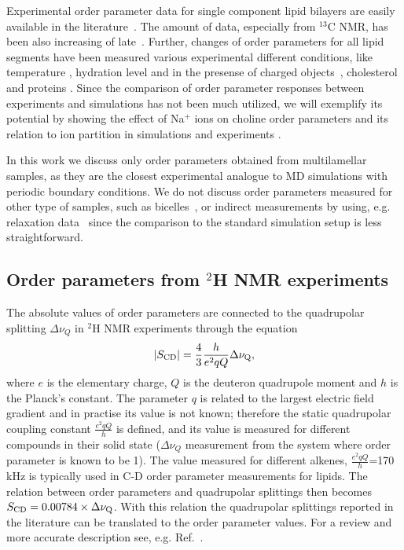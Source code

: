 \documentclass[aps,prl,superscriptaddress,twocolumn]{revtex4}
\begin{document}
Experimental order parameter data for single component lipid bilayers are easily available in the literature~\cite{castro07,castro08,leftin11,marsh13,ferreira13,leftin13,leftin14,botan15}. 
The amount of data, especially from $^{13}$C NMR, has been also increasing of late~\cite{castro07,castro08,ferreira13,leftin13,leftin14}.
Further, changes of order parameters for all lipid segments have been measured various experimental
different conditions, like temperature \cite{seelig74,gally75,seelig77,douliez95}, 
hydration level \cite{bechinger91,ulrich94,mallikarjunaiah11,dvinskikh05a} and in the presense 
of charged objects~\cite{akutsu81,altenbach84,seelig87,scherer89}, 
cholesterol \cite{brown78,douliez95,ferreira13,leftin14} and proteins \cite{kuchinka89,roux90,leftin13}.
Since the comparison of order parameter responses between experiments and simulations
has not been much utilized, we will exemplify its potential by showing
the effect of Na$^+$ ions on choline order parameters and its relation to ion partition in 
simulations \cite{ionpaper} and experiments \cite{akutsu81,altenbach84,seelig87,scherer89}.

In this work we discuss only order parameters obtained from multilamellar samples, as they are  the closest experimental analogue to MD simulations with periodic boundary conditions. 
We do not discuss order parameters measured for other type of samples, such as 
bicelles~\cite{aussenac03,raffard00,sanders92}, or indirect measurements by using, e.g. relaxation
data~\cite{marbella15} since the comparison to the standard simulation setup is less straightforward.  



\subsection{Order parameters from $^2$H NMR experiments}\label{DopSECTION}

The absolute values of order parameters are connected to the quadrupolar splitting $\Delta \nu_Q$ 
in $^2$H NMR experiments through the equation 
\begin{equation}\label{HNMRop}
|S_{{\rm CD}}|=\frac{4}{3} \frac{h}{e^2qQ} \Delta \nu_{{\rm Q}}, 
\end{equation}
where $e$ is the elementary charge, $Q$ is the deuteron quadrupole moment and $h$ is the Planck's constant. 
The parameter $q$ is related to the largest electric field gradient and in practise its value is not known; 
therefore the static quadrupolar coupling constant $\frac{e^2qQ}{h}$ is defined, and its value is measured for 
different compounds in their solid state ($\Delta \nu_Q$ measurement from the system where order parameter is known to be 1). 
The value measured for different alkenes, $\frac{e^2qQ}{h}$=170 kHz is typically used in 
C-D order parameter measurements for lipids. The relation between order parameters 
and quadrupolar splittings then becomes $S_{{\rm CD}}=0.00784 \times \Delta \nu_{{\rm Q}}$.
With this relation the quadrupolar splittings reported in the literature can be translated to 
the order parameter values. For a review and more accurate description see, e.g. Ref.~\cite{seelig77c}.
\end{document}
